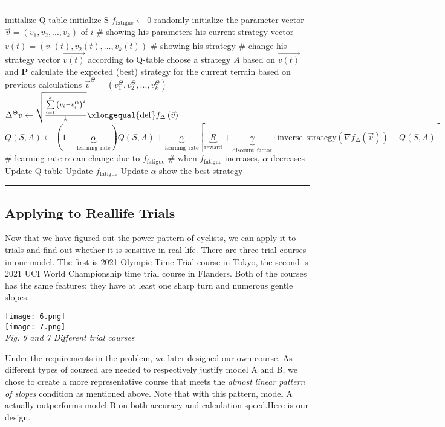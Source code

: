 \documentclass[14pt]{article}
\theoremstyle{definition}
\theoremstyle{remark}
\numberwithin{equation}{section}
\begin{document}
			\rule[-10pt]{15cm}{0.05em}
			\begin{algorithmic}
				\STATE initialize Q-table
				\STATE initialize S
				\STATE $f_{\mathrm{fatigue}}\leftarrow 0$
				\STATE randomly initialize the parameter vector $\vec{v}=\left( v_1,v_2,...,v_k \right)$ of $i$ \# showing his parameters
				\STATE his current strategy vector $\vec{v\left(t\right)}=\left( v_1\left(t\right),v_2\left(t\right),...,v_k\left(t\right) \right)$ \# showing his strategy
				\ENDFOR
				\STATE \# change his strategy vector $\vec{v\left(t\right)}$ according to Q-table
				\STATE choose a strategy \textbf{$A$} based on $\vec{v\left(t\right)}$ and \textbf{P}
				\STATE calculate the expected (best) strategy for the current terrain based on previous calculations $\vec{v}^{\Theta}=\left( v_{1}^{\Theta},v_{2}^{\Theta},...,v_{k}^{\Theta} \right) $
				\STATE
				\STATE $\Delta ^{\Theta}v\leftarrow \sqrt{\frac{\sum\limits_{i=1}^k{\left( v_i-v_{i}^{\Theta} \right) ^2}}{k}}\xlongequal{\mathrm{def}}f_{\Delta}\left( \vec{v} \right) $
				\STATE
				\STATE $Q(S,A)\gets (1-\underset{\mathrm{learning}\:\:\mathrm{rate}}{\underbrace{\alpha }})Q(S,A)+\underset{\mathrm{learning}\:\:\mathrm{rate}}{\underbrace{\alpha }}[\underset{\mathrm{reward}}{\underbrace{R}}+\underset{\mathrm{discount}\:\:\mathrm{factor}}{\underbrace{\gamma }}\cdot \mathrm{inverse}\:\:\mathrm{strategy}\left( \nabla f_{\Delta}\left( \vec{v} \right) \right) -Q(S,A)]$
				\STATE
				\STATE \# learning rate $\alpha$ can change due to $f_{\mathrm{fatigue}}$
				\STATE \# when $f_{\mathrm{fatigue}}$ increases, $\alpha$ decreases
				\STATE Update Q-table
				\STATE Update $f_{\mathrm{fatigue}}$
				\STATE Update $\alpha$
				\ENDWHILE
				\STATE show the best strategy
			\end{algorithmic}
			\rule[-10pt]{15cm}{0.05em}	
	\subsection{Applying to Reallife Trials}
	Now that we have figured out the power pattern of cyclists, we can apply it to trials and find out whether it is sensitive in real life. There are three trial courses in our model. The first is 2021 Olympic Time Trial course in Tokyo\cite{tokyo}, the second is 2021 UCI World Championship time trial course in Flanders\cite{UCI}. Both of the courses has the same features: they have at least one sharp turn and numerous gentle slopes.

	\begin{center}
		\texttt{[image: 6.png]}\\
		\texttt{[image: 7.png]}\\
		\small \textit{Fig. 6 and 7  Different trial courses}
	\end{center}	
	Under the requirements in the problem, we later designed our own course. As different types of coursed are needed to respectively justify model A and B, we chose to create a more representative course that meets the \textit{almost linear pattern of slopes} condition as mentioned above. Note that with this pattern, model A actually outperforms model B on both accuracy and calculation speed.Here is our design.
\end{document}
